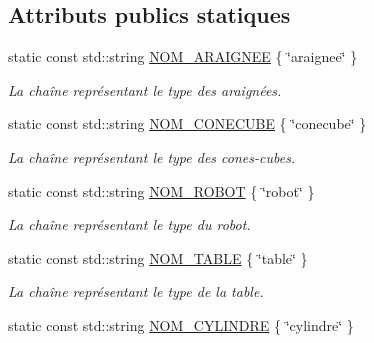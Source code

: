 \subsection*{Attributs publics statiques}
\begin{DoxyCompactItemize}
\item 
\hypertarget{group__inf2990_ga1035430c1c08b95d17f891ae89b33b80}{static const std\-::string \hyperlink{group__inf2990_ga1035430c1c08b95d17f891ae89b33b80}{N\-O\-M\-\_\-\-A\-R\-A\-I\-G\-N\-E\-E} \{ \char`\"{}araignee\char`\"{} \}}\label{group__inf2990_ga1035430c1c08b95d17f891ae89b33b80}

\begin{DoxyCompactList}\small\item\em La chaîne représentant le type des araignées. \end{DoxyCompactList}\item 
\hypertarget{group__inf2990_gae849656178f4dad34106f525bf37341a}{static const std\-::string \hyperlink{group__inf2990_gae849656178f4dad34106f525bf37341a}{N\-O\-M\-\_\-\-C\-O\-N\-E\-C\-U\-B\-E} \{ \char`\"{}conecube\char`\"{} \}}\label{group__inf2990_gae849656178f4dad34106f525bf37341a}

\begin{DoxyCompactList}\small\item\em La chaîne représentant le type des cones-\/cubes. \end{DoxyCompactList}\item 
\hypertarget{group__inf2990_ga9a6799aa8903b858929bf675e4468aac}{static const std\-::string \hyperlink{group__inf2990_ga9a6799aa8903b858929bf675e4468aac}{N\-O\-M\-\_\-\-R\-O\-B\-O\-T} \{ \char`\"{}robot\char`\"{} \}}\label{group__inf2990_ga9a6799aa8903b858929bf675e4468aac}

\begin{DoxyCompactList}\small\item\em La chaîne représentant le type du robot. \end{DoxyCompactList}\item 
\hypertarget{group__inf2990_ga89e651c1a28481ce70f473bd15555114}{static const std\-::string \hyperlink{group__inf2990_ga89e651c1a28481ce70f473bd15555114}{N\-O\-M\-\_\-\-T\-A\-B\-L\-E} \{ \char`\"{}table\char`\"{} \}}\label{group__inf2990_ga89e651c1a28481ce70f473bd15555114}

\begin{DoxyCompactList}\small\item\em La chaîne représentant le type de la table. \end{DoxyCompactList}\item 
\hypertarget{group__inf2990_gae74e1de66e37dee6ef6cb6df82424c0d}{static const std\-::string \hyperlink{group__inf2990_gae74e1de66e37dee6ef6cb6df82424c0d}{N\-O\-M\-\_\-\-C\-Y\-L\-I\-N\-D\-R\-E} \{ \char`\"{}cylindre\char`\"{} \}}\label{group__inf2990_gae74e1de66e37dee6ef6cb6df82424c0d}


\end{DoxyCompactItemize}
